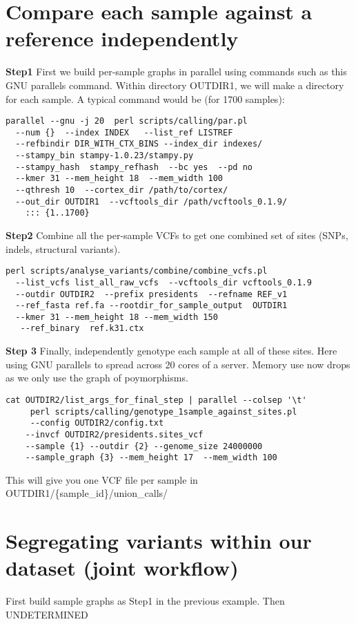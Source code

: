 \documentclass[a4paper,9pt]{extarticle}
\begin{document}
\begin{multicols*}{2}
\section{Compare each sample against a reference independently}

{\bf Step1 }First we build per-sample graphs in parallel using commands such as this GNU parallels command. Within directory OUTDIR1, we will make a directory for each sample. A typical command would be (for 1700 samples):
\begin{verbatim}
parallel --gnu -j 20  perl scripts/calling/par.pl 
  --num {}  --index INDEX   --list_ref LISTREF 
  --refbindir DIR_WITH_CTX_BINS --index_dir indexes/ 
  --stampy_bin stampy-1.0.23/stampy.py 
  --stampy_hash  stampy_refhash  --bc yes  --pd no 
  --kmer 31 --mem_height 18  --mem_width 100 
  --qthresh 10  --cortex_dir /path/to/cortex/ 
  --out_dir OUTDIR1  --vcftools_dir /path/vcftools_0.1.9/
    ::: {1..1700}
\end{verbatim}
{\bf Step2} Combine all the per-sample VCFs to get one combined set of sites (SNPs, indels, structural variants).
\begin{verbatim}
perl scripts/analyse_variants/combine/combine_vcfs.pl 
  --list_vcfs list_all_raw_vcfs  --vcftools_dir vcftools_0.1.9 
  --outdir OUTDIR2  --prefix presidents  --refname REF_v1 
  --ref_fasta ref.fa --rootdir_for_sample_output  OUTDIR1
  --kmer 31 --mem_height 18 --mem_width 150
   --ref_binary  ref.k31.ctx
\end{verbatim}
{\bf Step 3} Finally, independently genotype each sample at all of these sites. Here using GNU parallels to spread across 20 cores of a server. Memory use now drops as we only use the graph of poymorphisms.
\begin{verbatim}
cat OUTDIR2/list_args_for_final_step | parallel --colsep '\t' 
     perl scripts/calling/genotype_1sample_against_sites.pl 
	 --config OUTDIR2/config.txt 
 	--invcf OUTDIR2/presidents.sites_vcf 
	--sample {1} --outdir {2} --genome_size 24000000 
 	--sample_graph {3} --mem_height 17  --mem_width 100
\end{verbatim}
This will give you one VCF file per sample in OUTDIR1/\{sample\_id\}/union\_calls/

\section{Segregating variants within our dataset (joint workflow)}
First build sample graphs as Step1 in the previous example. Then UNDETERMINED




\end{multicols*}
\end{document}

